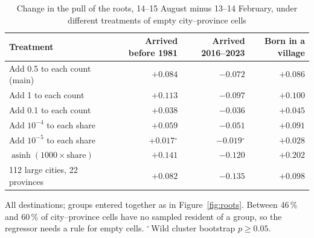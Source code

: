 \begin{table}[t]
\centering
\small
\caption{Change in the pull of the roots, 14--15 August minus 13--14 February, under different treatments of empty city--province cells}
\label{tab:zero}
\begin{tabular}{lrrr}
\toprule
Treatment & Arrived before 1981 & Arrived 2016--2023 & Born in a village \\
\midrule
Add 0.5 to each count (main) & $+0.084$ & $-0.072$ & $+0.086$ \\
Add 1 to each count & $+0.113$ & $-0.097$ & $+0.100$ \\
Add 0.1 to each count & $+0.038$ & $-0.036$ & $+0.045$ \\
Add $10^{-4}$ to each share & $+0.059$ & $-0.051$ & $+0.091$ \\
Add $10^{-5}$ to each share & $+0.017$$^{\circ}$ & $-0.019$$^{\circ}$ & $+0.028$ \\
$\operatorname{asinh}(1000\times\text{share})$ & $+0.141$ & $-0.120$ & $+0.202$ \\
112 large cities, 22 provinces & $+0.082$ & $-0.135$ & $+0.098$ \\
\bottomrule
\end{tabular}
\par\smallskip
\begin{minipage}{\linewidth}\footnotesize
All destinations; groups entered together as in Figure~\ref{fig:roots}. Between 46\,\% and 60\,\% of city--province cells have no sampled resident of a group, so the regressor needs a rule for empty cells. $^{\circ}$\,Wild cluster bootstrap $p\geq0.05$.
\end{minipage}
\end{table}
